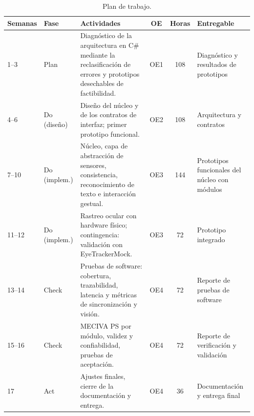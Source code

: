\begin{table}[H]
\centering
\caption{Plan de trabajo.}
\label{tab:plan_trabajo}
\footnotesize
\begin{tabularx}{\textwidth}{l l >{\raggedright\arraybackslash}X c c >{\raggedright\arraybackslash}p{3cm}}
\toprule
Semanas & Fase & Actividades & OE & Horas & Entregable \\ \midrule
1--3 & Plan & Diagnóstico de la arquitectura en C\# mediante la reclasificación de errores y prototipos desechables de factibilidad. & OE1 & 108 & Diagnóstico y resultados de prototipos \\ \midrule
4--6 & Do (diseño) & Diseño del núcleo y de los contratos de interfaz; primer prototipo funcional. & OE2 & 108 & Arquitectura y contratos \\ \midrule
7--10 & Do (implem.) & Núcleo, capa de abstracción de sensores, consistencia, reconocimiento de texto e interacción gestual. & OE3 & 144 & Prototipos funcionales del núcleo con módulos \\ \midrule
11--12 & Do (implem.) & Rastreo ocular con hardware físico; contingencia: validación con EyeTrackerMock. & OE3 & 72 & Prototipo integrado \\ \midrule
13--14 & Check & Pruebas de software: cobertura, trazabilidad, latencia y métricas de sincronización y visión. & OE4 & 72 & Reporte de pruebas de software \\ \midrule
15--16 & Check & MECIVA PS por módulo, validez y confiabilidad, pruebas de aceptación. & OE4 & 72 & Reporte de verificación y validación \\ \midrule
17 & Act & Ajustes finales, cierre de la documentación y entrega. & OE4 & 36 & Documentación y entrega final \\ \bottomrule
\end{tabularx}
\end{table}
